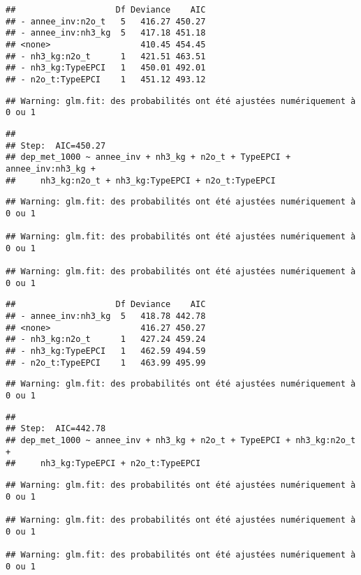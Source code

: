 \documentclass[
]{article}
\begin{document}
\begin{verbatim}
##                    Df Deviance    AIC
## - annee_inv:n2o_t   5   416.27 450.27
## - annee_inv:nh3_kg  5   417.18 451.18
## <none>                  410.45 454.45
## - nh3_kg:n2o_t      1   421.51 463.51
## - nh3_kg:TypeEPCI   1   450.01 492.01
## - n2o_t:TypeEPCI    1   451.12 493.12
\end{verbatim}

\begin{verbatim}
## Warning: glm.fit: des probabilités ont été ajustées numériquement à 0 ou 1
\end{verbatim}

\begin{verbatim}
## 
## Step:  AIC=450.27
## dep_met_1000 ~ annee_inv + nh3_kg + n2o_t + TypeEPCI + annee_inv:nh3_kg + 
##     nh3_kg:n2o_t + nh3_kg:TypeEPCI + n2o_t:TypeEPCI
\end{verbatim}

\begin{verbatim}
## Warning: glm.fit: des probabilités ont été ajustées numériquement à 0 ou 1

## Warning: glm.fit: des probabilités ont été ajustées numériquement à 0 ou 1

## Warning: glm.fit: des probabilités ont été ajustées numériquement à 0 ou 1
\end{verbatim}

\begin{verbatim}
##                    Df Deviance    AIC
## - annee_inv:nh3_kg  5   418.78 442.78
## <none>                  416.27 450.27
## - nh3_kg:n2o_t      1   427.24 459.24
## - nh3_kg:TypeEPCI   1   462.59 494.59
## - n2o_t:TypeEPCI    1   463.99 495.99
\end{verbatim}

\begin{verbatim}
## Warning: glm.fit: des probabilités ont été ajustées numériquement à 0 ou 1
\end{verbatim}

\begin{verbatim}
## 
## Step:  AIC=442.78
## dep_met_1000 ~ annee_inv + nh3_kg + n2o_t + TypeEPCI + nh3_kg:n2o_t + 
##     nh3_kg:TypeEPCI + n2o_t:TypeEPCI
\end{verbatim}

\begin{verbatim}
## Warning: glm.fit: des probabilités ont été ajustées numériquement à 0 ou 1

## Warning: glm.fit: des probabilités ont été ajustées numériquement à 0 ou 1

## Warning: glm.fit: des probabilités ont été ajustées numériquement à 0 ou 1
\end{verbatim}
\end{document}
